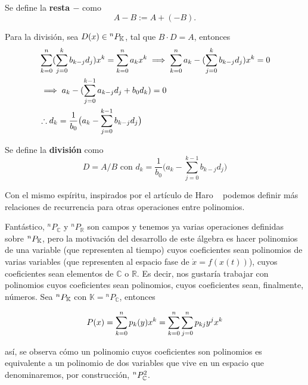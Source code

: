 Se define la \textbf{resta $-$} como
\begin{equation}
 A - B := A + (-B).
 \label{eq:polisub}
\end{equation}


Para la división, sea $D(x) \in {^{n}P_{\mathbb{K}}}$, tal que  $B \cdot D = A $,  entonces 
\begin{align*}
 & \sum_{k=0}^n  (\sum_{j=0}^k b_{k-j} d_j )  x^k = \sum_{k=0}^n  a_k  x^k \implies \sum_{k=0}^n  a_k - (\sum_{j=0}^k b_{k-j} d_j )  x^k = 0 \\ 
 &\implies a_k - ( \sum_{j=0}^{k-1}a_{k-j} d_j + b_0 d_k ) = 0 \\
 & \therefore d_k = \frac{1}{b_0} \big( a_k - \sum_{j=0}^{k-1} b_{k-j} d_j \big)  
\end{align*}

Se define la \textbf{división} como
\begin{equation}
 D = A/B \text{ con } d_k = \frac{1}{b_0} \big( a_k - \sum_{j=0}^{k-1} b_{k-j} d_j \big)
 \label{eq:polidiv}
\end{equation}

Con el mismo espíritu, inspirados por el artículo de Haro ~\cite{Haro2009} podemos definir más relaciones de recurrencia para otras operaciones entre polinomios.



Fantástico, $^nP_{\mathbb{C}}$ y $^nP_{\mathbb{R}}$ son campos y tenemos ya varias operaciones definidas sobre ${^{n}P_{\mathbb{K}}}$, pero la motivación del desarrollo de este álgebra es hacer polinomios de una variable (que representen al tiempo) cuyos coeficientes sean polinomios de varias variables (que representen al espacio fase de $\dot{x} = f(x(t))$), cuyos coeficientes sean elementos de $\mathbb{C}$ o $\mathbb{R}$. Es decir, nos gustaría trabajar con polinomios cuyos coeficientes sean polinomios, cuyos coeficientes sean, finalmente, números.
Sea  ${^{n}P_{\mathbb{K}}}$ con $\mathbb{K} = {{^{n}P_{\mathbb{C}}}}$, entonces

\begin{align*}
 P(x) = \sum_{k=0}^n p_k(y) x^k = \sum_{k=0}^n \sum_{j=0}^n p_{kj} y^j x^k
\end{align*}

así, se observa cómo un polinomio cuyos coeficientes son polinomios es equivalente a un polinomio de dos variables que vive en un espacio que denominaremos, por construcción, ${^{n}P_{\mathbb{C}}^ 2 }$.

